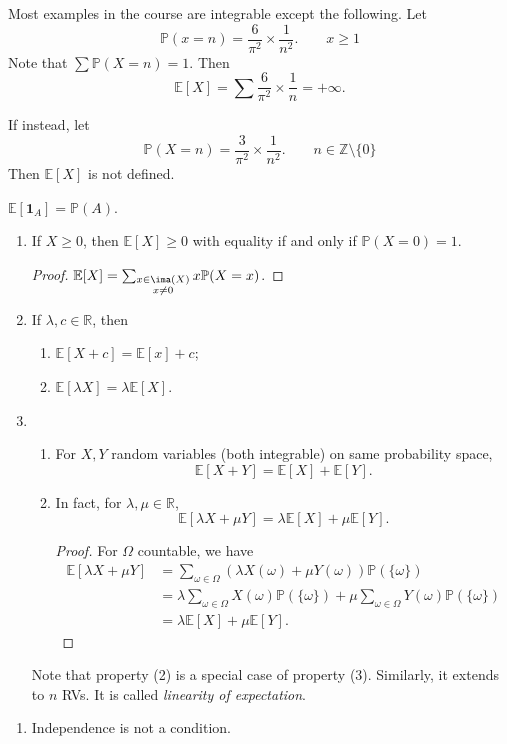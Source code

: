 \begin{example}
    Most examples in the course are integrable except the following. Let
    \[
        \mathbb{P}(x = n) = \frac{6}{\pi^2} \times \frac{1}{n^2}. \qquad x \geq 1
    \]
    Note that \(\sum \mathbb{P}(X = n) = 1\). Then
    \[
        \mathbb{E}[X] = \sum \frac{6}{\pi^2} \times\frac{1}{n} = + \infty.
    \]

    If instead, let
    \[
        \mathbb{P}(X = n) = \frac{3}{\pi^2} \times\frac{1}{n^2}.\qquad n \in \mathbb{Z}\setminus \{0\}
    \]
    Then \(\mathbb{E}[X]\) is not defined.
\end{example}
\begin{example}
    \(\mathbb{E}[\mathbf{1}_A] = \mathbb{P}(A)\).
\end{example}
\begin{property}
\begin{enumerate}
    \item If \(X \geq 0\), then \(\mathbb{E}[X] \geq 0\) with equality if and only if \(\mathbb{P}(X = 0) = 1\).
    \begin{proof}
        \(\mathbb{E}[X] = \sum_{\substack{x \in \ima(X)\\ x\neq 0}} x \mathbb{P}(X = x)\).
    \end{proof}
    \item If \(\lambda, c \in \mathbb{R}\), then
    \begin{enumerate}
        \item \(\mathbb{E}[X + c] = \mathbb{E}[x] + c\);
        \item \(\mathbb{E}[\lambda X] = \lambda\mathbb{E}[X]\).
    \end{enumerate}
    \item \begin{enumerate}
        \item For \(X, Y\) random variables (both integrable) on same probability space,
        \[
            \mathbb{E}[X + Y] = \mathbb{E}[X] + \mathbb{E}[Y].
        \]
        \item In fact, for \(\lambda, \mu \in \mathbb{R}\),
        \[
            \mathbb{E}[\lambda X + \mu Y] = \lambda \mathbb{E}[X] + \mu\mathbb{E}[Y].
        \]
        \begin{proof}
            For \(\Omega\) countable, we have
            \begin{align*}
                \mathbb{E}[\lambda X + \mu Y] &= \sum_{\omega\in \Omega} (\lambda X(\omega) + \mu Y(\omega))\mathbb{P}(\{\omega\})\\
                &= \lambda \sum_{\omega\in\Omega} X(\omega)\mathbb{P}(\{\omega\}) + \mu\sum_{\omega\in\Omega} Y(\omega)\mathbb{P}(\{\omega\})\\
                &= \lambda \mathbb{E}[X] + \mu\mathbb{E}[Y].
            \end{align*}
        \end{proof}
    \end{enumerate}
    Note that property (2) is a special case of property (3). Similarly, it extends to \(n\) RVs. It is called \textit{linearity of expectation}.
\end{enumerate}
\end{property}
\begin{remark}
    \begin{enumerate}
        \item Independence is not a condition.
    \end{enumerate}
\end{remark}